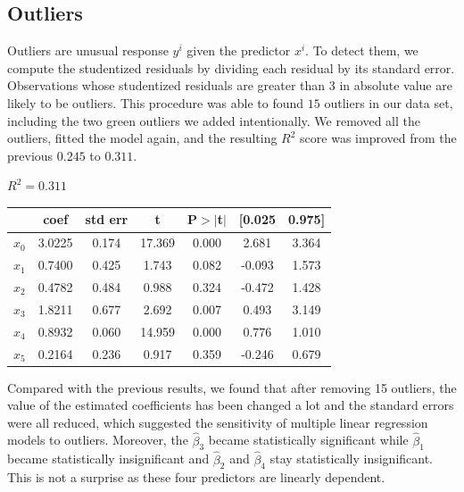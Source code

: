 \documentclass{article}
\begin{document}
\subsection{Outliers}
Outliers are unusual response $y^i$ given the predictor $x^i$. To detect them, we compute the studentized residuals by dividing each residual by its standard error. Observations whose studentized residuals are greater than 3 in absolute value are likely to be outliers. This procedure was able to found $15$ outliers in our data set, including the two green outliers we added intentionally. We removed all the outliers, fitted the model again, and the resulting $R^2$ score was improved from the previous $0.245$ to $0.311$.
\begin{center}
$R^2 = 0.311$\\
\begin{tabular}{lcccccc}
\hline
           & \textbf{coef} & \textbf{std err} & \textbf{t} & \textbf{P$> |$t$|$} & \textbf{[0.025} & \textbf{0.975]}  \\
\midrule
\textbf{$x_0$} &       3.0225  &        0.174     &    17.369  &         0.000        &        2.681    &        3.364     \\
\textbf{$x_1$} &       0.7400  &        0.425     &     1.743  &         0.082        &       -0.093    &        1.573     \\
\textbf{$x_2$} &       0.4782  &        0.484     &     0.988  &         0.324        &       -0.472    &        1.428     \\
\textbf{$x_3$} &       1.8211  &        0.677     &     2.692  &         0.007        &        0.493    &        3.149     \\
\textbf{$x_4$} &       0.8932  &        0.060     &    14.959  &         0.000        &        0.776    &        1.010     \\
\textbf{$x_5$} &       0.2164  &        0.236     &     0.917  &         0.359        &       -0.246    &        0.679     \\
\bottomrule
\end{tabular}
\end{center}
Compared with the previous results, we found that after removing 15 outliers, the value of the estimated coefficients has been changed a lot and the standard errors were all reduced, which suggested the sensitivity of multiple linear regression models to outliers. Moreover, the $\hat{\beta}_3$ became statistically significant while $\hat{\beta}_1$ became statistically insignificant and $\hat{\beta}_2$ and $\hat{\beta}_4$ stay statistically insignificant. This is not a surprise as these four predictors are linearly dependent. 
\end{document}
